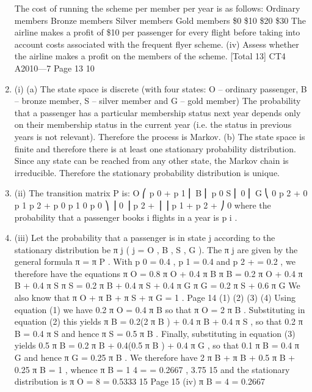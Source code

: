 \documentclass[a4paper,12pt]{article}
\begin{document}
\begin{enumerate}
The cost of running the scheme per member per year is as follows:
Ordinary members
Bronze members
Silver members
Gold members
\$0
\$10
\$20
\$30
The airline makes a profit of \$10 per passenger for every flight before taking into
account costs associated with the frequent flyer scheme.
(iv)
Assess whether the airline makes a profit on the members of the scheme. 
[Total 13]
CT4 A2010—7
Page 13 %
10
\item (i)
(a)
The state space is discrete (with four states: O – ordinary passenger,
B – bronze member, S – silver member and G – gold member)
The probability that a passenger has a particular membership
status next year depends only on their membership status in the
current year (i.e. the status in previous years is not relevant).
Therefore the process is Markov.
(b)
The state space is finite and therefore there is at least one stationary
probability distribution.
Since any state can be reached from any other state, the
Markov chain is irreducible.
Therefore the stationary probability distribution is unique.
\item (ii)
The transition matrix P is:
O ⎛ p 0 + p 1
⎜
B ⎜ p 0
S ⎜ 0
⎜
G ⎝ 0
p 2 + 0
p 1 p 2 +
p 0 p 1
0 p 0
⎞
⎟
0
⎟
p 2 + ⎟
⎟
p 1 + p 2 + ⎠
0
where the probability that a passenger books i flights in a year is p i .
\item (iii)
Let the probability that a passenger is in state j according to the stationary
distribution be π j ( j = O , B , S , G ).
The π j are given by the general formula
π = π P .
With p 0 = 0.4 , p 1 = 0.4 and p 2 + = 0.2 , we therefore have the equations
π O = 0.8 π O + 0.4 π B
π B = 0.2 π O + 0.4 π B + 0.4 π S
π S = 0.2 π B + 0.4 π S + 0.4 π G
π G = 0.2 π S + 0.6 π G
We also know that
π O + π B + π S + π G = 1 .
Page 14
(1)
(2)
(3)
(4) %
Using equation (1) we have
0.2 π O = 0.4 π B
so that
π O = 2 π B .
Substituting in equation (2) this yields
π B = 0.2(2 π B ) + 0.4 π B + 0.4 π S ,
so that
0.2 π B = 0.4 π S
and hence
π S = 0.5 π B .
Finally, substituting in equation (3) yields
0.5 π B = 0.2 π B + 0.4(0.5 π B ) + 0.4 π G ,
so that
0.1 π B = 0.4 π G
and hence
π G = 0.25 π B .
We therefore have
2 π B + π B + 0.5 π B + 0.25 π B = 1 ,
whence
π B =
1
4
= = 0.2667 ,
3.75 15
and the stationary distribution is
π O =
8
= 0.5333
15
Page 15 %
(iv)
π B = 4
= 0.2667

\end{enumerate}
\end{document}
